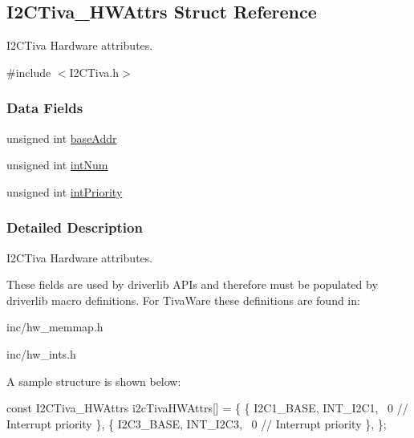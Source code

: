 \subsection{I2\+C\+Tiva\+\_\+\+H\+W\+Attrs Struct Reference}
\label{struct_i2_c_tiva___h_w_attrs}


I2\+C\+Tiva Hardware attributes.  




{\ttfamily \#include $<$I2\+C\+Tiva.\+h$>$}

\subsubsection*{Data Fields}
\begin{DoxyCompactItemize}
\item 
unsigned int \hyperlink{struct_i2_c_tiva___h_w_attrs_a12ab64360a0c09bbc1324d0935fcb63a}{base\+Addr}
\item 
unsigned int \hyperlink{struct_i2_c_tiva___h_w_attrs_adad44a5cf7a642e83e07b364e7623cb3}{int\+Num}
\item 
unsigned int \hyperlink{struct_i2_c_tiva___h_w_attrs_a767c3e84c819ebe48f87e378bb039834}{int\+Priority}
\end{DoxyCompactItemize}


\subsubsection{Detailed Description}
I2\+C\+Tiva Hardware attributes. 

These fields are used by driverlib A\+P\+Is and therefore must be populated by driverlib macro definitions. For Tiva\+Ware these definitions are found in\+:
\begin{DoxyItemize}
\item inc/hw\+\_\+memmap.\+h
\item inc/hw\+\_\+ints.\+h
\end{DoxyItemize}

A sample structure is shown below\+: 
\begin{DoxyCode}
\textcolor{keyword}{const} I2CTiva_HWAttrs i2cTivaHWAttrs[] = \{
    \{
        I2C1\_BASE,
        INT\_I2C1,
        ~0               \textcolor{comment}{// Interrupt priority}
    \},
    \{
        I2C3\_BASE,
        INT\_I2C3,
        ~0               \textcolor{comment}{// Interrupt priority}
    \},
\};
\end{DoxyCode}
 

